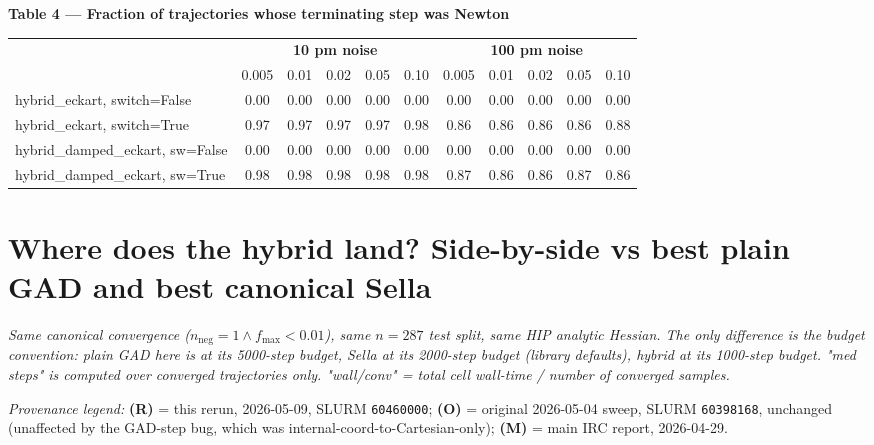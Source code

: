 \documentclass[11pt]{article}
\begin{document}
\begin{center}\footnotesize
\textbf{Table 4 --- Fraction of trajectories whose terminating step was Newton}\\[0.4em]
\begin{tabular}{l|ccccc|ccccc}
\toprule
& \multicolumn{5}{c|}{\textbf{10 pm noise}} & \multicolumn{5}{c}{\textbf{100 pm noise}} \\
                                  & 0.005 & 0.01 & 0.02 & 0.05 & 0.10 & 0.005 & 0.01 & 0.02 & 0.05 & 0.10 \\
\midrule
hybrid\_eckart, switch=False      & 0.00 & 0.00 & 0.00 & 0.00 & 0.00 & 0.00 & 0.00 & 0.00 & 0.00 & 0.00 \\
hybrid\_eckart, switch=True       & 0.97 & 0.97 & 0.97 & 0.97 & 0.98 & 0.86 & 0.86 & 0.86 & 0.86 & 0.88 \\
hybrid\_damped\_eckart, sw=False  & 0.00 & 0.00 & 0.00 & 0.00 & 0.00 & 0.00 & 0.00 & 0.00 & 0.00 & 0.00 \\
hybrid\_damped\_eckart, sw=True   & 0.98 & 0.98 & 0.98 & 0.98 & 0.98 & 0.87 & 0.86 & 0.86 & 0.87 & 0.86 \\
\bottomrule
\end{tabular}
\end{center}

\section*{Where does the hybrid land? Side-by-side vs best plain GAD and best canonical Sella}

\textit{Same canonical convergence ($n_{\text{neg}}{=}1 \wedge f_{\max}{<}0.01$),
same $n=287$ test split, same HIP analytic Hessian. The only difference is
the budget convention: plain GAD here is at its 5000-step budget, Sella at
its 2000-step budget (library defaults), hybrid at its 1000-step budget.
"med steps" is computed over converged trajectories only. "wall/conv" =
total cell wall-time / number of converged samples.}

\textit{Provenance legend:}
\textbf{(R)} = this rerun, 2026-05-09, SLURM \texttt{60460000};
\textbf{(O)} = original 2026-05-04 sweep, SLURM \texttt{60398168}, unchanged
(unaffected by the GAD-step bug, which was internal-coord-to-Cartesian-only);
\textbf{(M)} = main IRC report, 2026-04-29.
\end{document}
